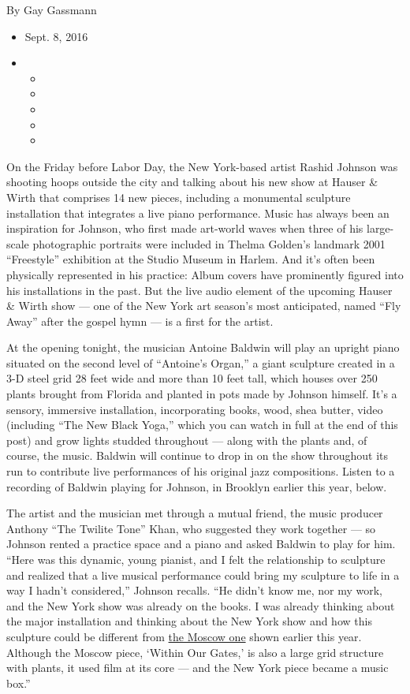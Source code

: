 By Gay Gassmann

\begin{itemize}
\item
  Sept. 8, 2016
\item
  \begin{itemize}
  \item
  \item
  \item
  \item
  \item
  \end{itemize}
\end{itemize}

On the Friday before Labor Day, the New York-based artist Rashid Johnson
was shooting hoops outside the city and talking about his new show at
Hauser \& Wirth that comprises 14 new pieces, including a monumental
sculpture installation that integrates a live piano performance. Music
has always been an inspiration for Johnson, who first made art-world
waves when three of his large-scale photographic portraits were included
in Thelma Golden's landmark 2001 ``Freestyle'' exhibition at the Studio
Museum in Harlem. And it's often been physically represented in his
practice: Album covers have prominently figured into his installations
in the past. But the live audio element of the upcoming Hauser \& Wirth
show --- one of the New York art season's most anticipated, named ``Fly
Away'' after the gospel hymn --- is a first for the artist.

At the opening tonight, the musician Antoine Baldwin will play an
upright piano situated on the second level of ``Antoine's Organ,'' a
giant sculpture created in a 3-D steel grid 28 feet wide and more than
10 feet tall, which houses over 250 plants brought from Florida and
planted in pots made by Johnson himself. It's a sensory, immersive
installation, incorporating books, wood, shea butter, video (including
``The New Black Yoga,'' which you can watch in full at the end of this
post) and grow lights studded throughout --- along with the plants and,
of course, the music. Baldwin will continue to drop in on the show
throughout its run to contribute live performances of his original jazz
compositions. Listen to a recording of Baldwin playing for Johnson, in
Brooklyn earlier this year, below.

The artist and the musician met through a mutual friend, the music
producer Anthony ``The Twilite Tone'' Khan, who suggested they work
together --- so Johnson rented a practice space and a piano and asked
Baldwin to play for him. ``Here was this dynamic, young pianist, and I
felt the relationship to sculpture and realized that a live musical
performance could bring my sculpture to life in a way I hadn't
considered,'' Johnson recalls. ``He didn't know me, nor my work, and the
New York show was already on the books. I was already thinking about the
major installation and thinking about the New York show and how this
sculpture could be different from
\href{http://garagemca.org/en/event/rashid-johnson-within-our-gates}{the
Moscow one} shown earlier this year. Although the Moscow piece, `Within
Our Gates,' is also a large grid structure with plants, it used film at
its core --- and the New York piece became a music box.''

